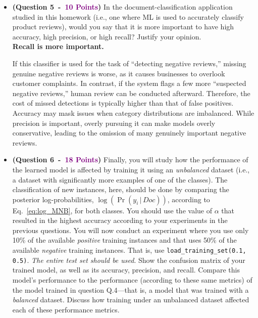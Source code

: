 \documentclass{article}
\newcommand{\POINTS}[1]{\textcolor{purple}{\textbf{{#1}}}}
\begin{document}
\begin{itemize}
    




\vspace{0.4cm}
 \item \textbf{(Question 5~-~\POINTS{10 Points})} In the document-classification application studied in this homework (i.e., one where ML is used to accurately classify product reviews), would you say that it is more important to have high accuracy, high precision, or high recall? Justify your opinion.
\\

\noindent \textbf{Recall is more important.}


If this classifier is used for the task of “detecting negative reviews,” missing genuine negative reviews is worse, as it causes businesses to overlook customer complaints. In contrast, if the system flags a few more “suspected negative reviews,” human review can be conducted afterward. Therefore, the cost of missed detections is typically higher than that of false positives. Accuracy may mask issues when category distributions are imbalanced. While precision is important, overly pursuing it can make models overly conservative, leading to the omission of many genuinely important negative reviews.
    



\vspace{0.4cm}
 \item \textbf{(Question 6~-~\POINTS{18 Points})} Finally, you will study how the performance of the learned model is affected by training it using an \textit{unbalanced} dataset (i.e., a dataset with significantly more examples of one of the classes). The classification of new instances, here, should be done by comparing the posterior log-probabilities, $\log(\Pr(y_i \, | \, Doc))$, according to Eq.~\eqref{eq:log_MNB}, for both classes. You should use the value of $\alpha$ that resulted in the highest accuracy according to your experiments in the previous questions. You will now conduct an experiment where you use only 10\% of the available \textit{positive} training instances and that uses  50\% of the available \textit{negative} training instances. That is, use \texttt{load\_training\_set(0.1, 0.5)}. \textit{The entire test set should be used}. Show the confusion matrix of your trained model, as well as its accuracy, precision, and recall. Compare this model's performance to the performance (according to these same metrics) of the model trained in question Q.4---that is, a model that was trained with a \textit{balanced} dataset. Discuss how training under an unbalanced dataset affected each of these performance metrics.
\\


\end{itemize}
\end{document}
